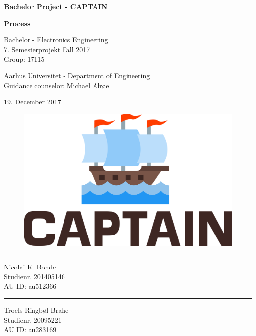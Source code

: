 \begin{titlingpage}
		
	\begin{center}
			{\huge\bfseries Bachelor Project - CAPTAIN}\\
			\vspace{10pt}
			
			{\Huge\bfseries Process}\\
			
			\vspace{20pt}
			
			{Bachelor - Electronics Engineering}\\
			{\large 7. Semesterprojekt Fall 2017}\\
			{Group: 17115}
			
			\vspace{10pt}
			
			Aarhus Universitet - Department of Engineering\\
			Guidance counselor: Michael Alrøe
			\vspace{10pt}
			
			19. December 2017
			\vspace{10pt}
			\begin{figure}[H]
				\centering
				\includegraphics[max width=0.7\linewidth]{logo.png}
			\end{figure}
			\vspace{50pt}
			\begin{minipage}{0.25\linewidth}
				\centering
				\hrule
				\vspace{12pt}
				Nicolai K. Bonde\\
				Studienr. 201405146\\
				AU ID: au512366
			\end{minipage}
			\hspace{50pt}
			\begin{minipage}{0.25\linewidth}
				\centering
				\hrule
				\vspace{12pt}
				Troels Ringbøl Brahe\\
				Studienr. 20095221\\
				AU ID: au283169
			\end{minipage}
	\end{center}
\end{titlingpage}